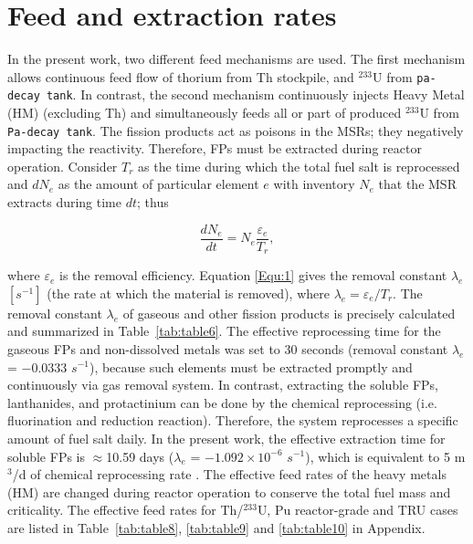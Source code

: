 \section{Feed and extraction rates} \label{Feed-and-extraction-rates}
In the present work, two different feed mechanisms are used. The first 
mechanism allows continuous feed flow of thorium from Th stockpile, and 
$^{233}$U from \texttt{pa-decay tank}. In contrast, the second mechanism 
continuously injects Heavy Metal (HM) (excluding Th) and simultaneously feeds  
all or part of produced $^{233}$U from \texttt{Pa-decay tank}. The fission 
products act as poisons in the MSRs; they negatively impacting the reactivity. 
Therefore, \gls{FPs} must be extracted during reactor operation. Consider 
$T_{r}$ as the time during which the total fuel salt is reprocessed and 
$dN_{e}$ as the amount of particular element $e$ with inventory $N_{e}$ that 
the \gls{MSR} extracts during time $dt$; thus \cite{nuttin2005potential}

\begin{equation}
\label{Equ:1}
\dfrac{dN_{e}}{dt} = N_{e}\dfrac{\varepsilon_{e}}{T_{r}},	
\end{equation}

where $\varepsilon_{e}$ is the removal efficiency. Equation \ref{Equ:1} gives 
the removal constant $\lambda_{e}$ $[s^{-1}]$ (the rate at which the material 
is removed), where $\lambda_{e}=\varepsilon_{e}/T_{r}$. The removal constant 
$\lambda_{e}$ of gaseous and other fission products is precisely calculated 
and summarized in Table~\ref{tab:table6}. The effective reprocessing time for 
the gaseous \gls{FPs} and non-dissolved metals was set to 30 seconds (removal 
constant $\lambda_{e}$ = $-0.0333$ $s^{-1}$), because such elements must be 
extracted promptly and continuously via gas removal system. In contrast, 
extracting the soluble \gls{FPs}, lanthanides, and protactinium can be done by 
the chemical reprocessing (i.e. fluorination and reduction reaction). 
Therefore, the system reprocesses a specific amount of fuel salt daily. In the 
present work, the effective extraction time for soluble \gls{FPs} is 
$\approx$10.59 days ($\lambda_{e}$ = $-1.092\times10^{-6}$ $s^{-1}$), which is 
equivalent to 5 m$^3$/d of chemical reprocessing rate 
\cite{nuttin2005potential,li_optimization_2018}. The effective feed rates of 
the heavy metals (HM) are changed during reactor operation to conserve the 
total fuel mass and criticality. The effective feed rates for Th/$^{233}$U, Pu reactor-grade and TRU cases are listed in Table~\ref{tab:table8}, \ref{tab:table9} and \ref{tab:table10} in Appendix.


